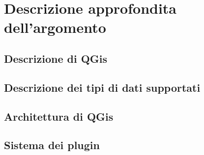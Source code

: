 
\chapter{Descrizione approfondita dell'argomento}
\label{cap:descrizione}

\lipsum[1]

\section{Descrizione di QGis}
\lipsum[2]

\section{Descrizione dei tipi di dati supportati}
\lipsum[3]

\section{Architettura di QGis}
\lipsum[4]

\section{Sistema dei plugin}
\lipsum[5]
